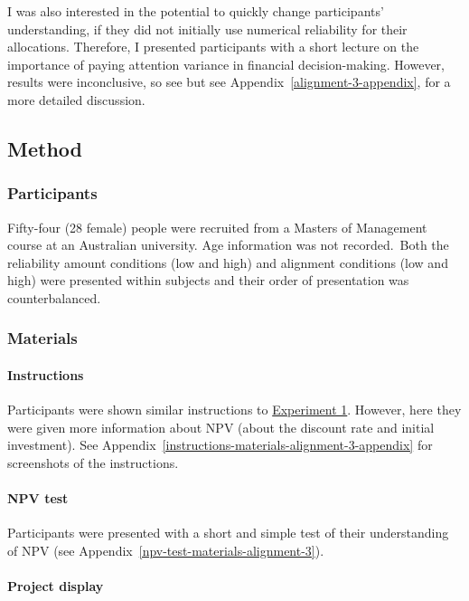 \documentclass[a4paper, nobind, dvipsnames]{templates/ociamthesis}
\theoremstyle{definition}
\theoremstyle{definition}
\theoremstyle{definition}
\theoremstyle{definition}
\theoremstyle{remark}
\begin{document}
I was also interested in the potential to quickly change participants'
understanding, if they did not initially use numerical reliability for their
allocations. Therefore, I presented participants with a short lecture on the
importance of paying attention variance in financial decision-making. However,
results were inconclusive, so see but see
Appendix~\ref{alignment-3-appendix}, for a more detailed discussion.

\subsection{Method}

\subsubsection{Participants}

Fifty-four (28 female) people were recruited from a Masters of Management course at an Australian university. Age information was not recorded.~Both the reliability amount conditions (low and
high) and alignment conditions (low and high) were presented within subjects and
their order of presentation was counterbalanced.

\subsubsection{Materials}

\paragraph{Instructions}

Participants were shown similar instructions to \protect\hyperlink{instructions-materials-alignment-2}{Experiment
1}. However, here they were given more
information about NPV (about the discount rate and initial investment). See
Appendix~\ref{instructions-materials-alignment-3-appendix} for screenshots of
the instructions.

\paragraph{NPV test}

Participants were presented with a short and simple test of their understanding
of NPV (see Appendix~\ref{npv-test-materials-alignment-3}).

\paragraph{Project display}
\end{document}
